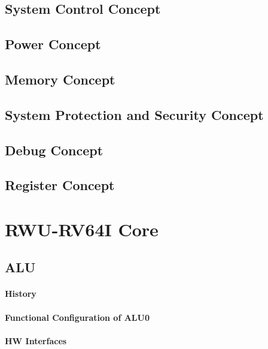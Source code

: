 \section{System Control Concept}

\section{Power Concept}

\section{Memory Concept}

\section{System Protection and Security Concept}

\section{Debug Concept}

\section{Register Concept}


\chapter{RWU-RV64I Core}
\section{ALU}
\label{sec:alufunc01}
\subsubsection{History}


\subsubsection{Functional Configuration of ALU0}


\subsubsection{HW Interfaces}


